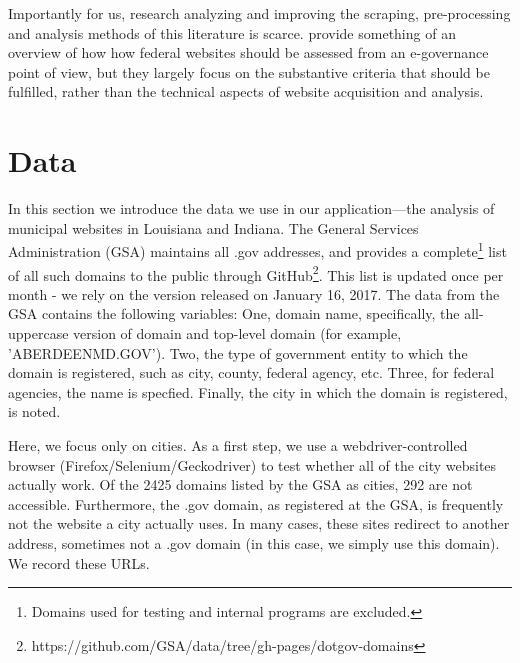 \documentclass[11pt]{article}
\begin{document}
Importantly for us, research analyzing and improving the scraping, pre-processing and analysis methods of this literature is scarce. \cite{Eschenfelder2002} provide something of an overview of how how federal websites should be assessed from an e-governance point of view, but they largely focus on the substantive criteria that should be fulfilled, rather than the technical aspects of website acquisition and analysis.




\section{Data}
In this section we introduce the data we use in our application---the analysis of municipal websites in Louisiana and Indiana. The General Services Administration (GSA) maintains all .gov addresses, and provides a complete\footnote{Domains used for testing and internal programs are excluded.} list of all such domains to the public through GitHub\footnote{https://github.com/GSA/data/tree/gh-pages/dotgov-domains}. This list is updated once per month - we rely on the version released on January 16, 2017. The data from the GSA contains the following variables: One, domain name, specifically, the all-uppercase version of domain and top-level domain (for example, 'ABERDEENMD.GOV'). Two, the type of government entity to which the domain is registered, such as city, county, federal agency, etc. Three, for federal agencies, the name is specfied. Finally, the city in which the domain is registered, is noted.

Here, we focus only on cities. As a first step, we use a webdriver-controlled browser (Firefox/Selenium/Geckodriver) to test whether all of the city websites actually work. Of the 2425 domains listed by the GSA as cities, 292 are not accessible. Furthermore, the .gov domain, as registered at the GSA, is frequently not the website a city actually uses. In many cases, these sites redirect to another address, sometimes not a .gov domain (in this case, we simply use this domain). We record these URLs.
\end{document}
